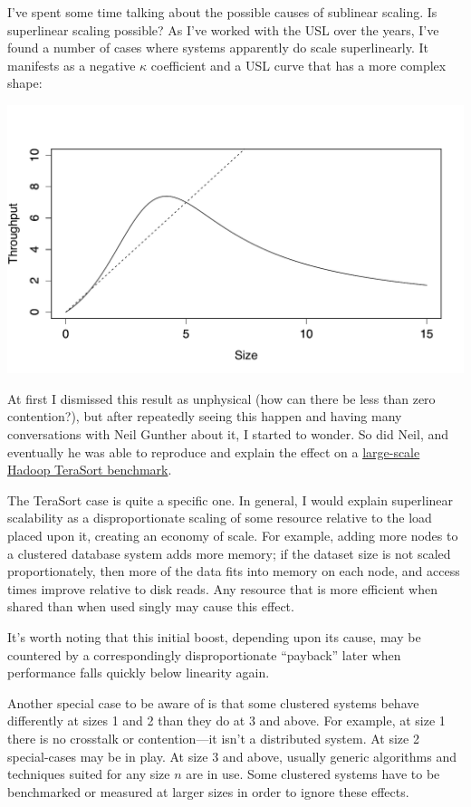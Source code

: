 \documentclass{vivid_layout}
\begin{document}
I've spent some time talking about the possible causes of sublinear scaling. Is
superlinear scaling possible? As I've worked with the USL over the years, I've
found a number of cases where systems apparently do scale superlinearly. It
manifests as a negative $\kappa$ coefficient and a USL curve that has a more
complex shape:
\begin{center}
\includegraphics[width=.85\linewidth]{scalability/superlinear}
\end{center}

At first I dismissed this result as unphysical (how can there be less than zero
contention?), but after repeatedly seeing this happen and having many
conversations with Neil Gunther about it, I started to wonder. So did Neil, and
eventually he was able to reproduce and explain the effect on a
\href{https://queue.acm.org/detail.cfm?id=2789974}{large-scale Hadoop TeraSort
benchmark}.

The TeraSort case is quite a specific one. In general, I would explain
superlinear scalability as a disproportionate scaling of some resource relative
to the load placed upon it, creating an economy of scale. For example, adding
more nodes to a clustered database system adds more memory; if the dataset size
is not scaled proportionately, then more of the data fits into memory on each
node, and access times improve relative to disk reads. Any resource that is more
efficient when shared than when used singly may cause this effect.

It's worth noting that this initial boost, depending upon its cause, may be
countered by a correspondingly disproportionate ``payback'' later when
performance falls quickly below linearity again.

Another special case to be aware of is that some clustered systems behave
differently at sizes 1 and 2 than they do at 3 and above. For example, at size 1
there is no crosstalk or contention---it isn't a distributed system. At size 2
special-cases may be in play. At size 3 and above, usually generic algorithms
and techniques suited for any size $n$ are in use. Some clustered systems have
to be benchmarked or measured at larger sizes in order to ignore these effects.
\end{document}

